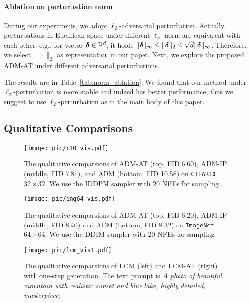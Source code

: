 
\paragraph{Ablation on perturbation norm} During our experiments, we adopt $\ell_{2}$-adversarial perturbation. Actually, perturbations in Euclidean space under different $\ell_{p}$ norm are equivalent with each other, e.g., for vector $\boldsymbol{\delta}\in \mathbb{R}^{d}$, it holds $\|\boldsymbol{\delta}\|_{\infty}\leq \|\boldsymbol{\delta}\|_{2} \leq \sqrt{d}\|\boldsymbol{\delta}\|_{\infty}$. Therefore, we select $\|\cdot\|_{2}$ as representation in our paper. Next, we explore the proposed ADM-AT under different adversarial perturbations.  

The results are in Table~\ref{tab:norm_ablation}. We found that our method under $\ell_2$-perturbation is more stable and indeed has better performance, thus we suggest to use $\ell_2$-perturbation as in the main body of this paper. 

\subsection{Qualitative Comparisons}

\begin{figure}[h]
    \centering
\texttt{[image: pic/c10\_vis.pdf]}
    \caption{The qualitative comparsions of ADM-AT (top, FID 6.60), ADM-IP (middle, FID 7.81), and ADM (bottom, FID 10.58) on \texttt{CIFAR10} $32\times32$. We use the IDDPM sampler with 20 NFEs for sampling.}\label{fig:vis_cifar}
\end{figure}


\begin{figure}[h]
    \centering
\texttt{[image: pic/img64\_vis.pdf]}
    \caption{The qualitative comparsions of ADM-AT (top, FID 6.20), ADM-IP (middle, FID 8.40) and ADM (bottom, FID 8.32) on \texttt{ImageNet} $64\times64$. We use the DDIM sampler with 20 NFEs for sampling.}\label{fig:vis_imagenet64}
\end{figure}

\begin{figure}[h]
    \centering
\texttt{[image: pic/lcm\_vis1.pdf]}
    \caption{The qualitative comparsions of LCM (left) and LCM-AT (right) with one-step generation. The text prompt is \textit{A photo of beautiful mountain with realistic sunset and blue lake, highly detailed, masterpiece.}}\label{fig:lcm_vis1}
\end{figure}

